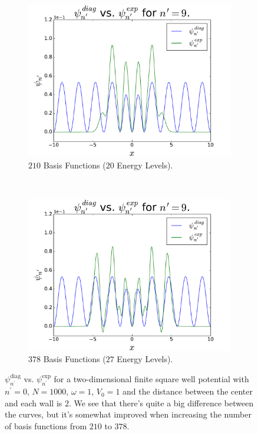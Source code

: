 \documentclass[../main.tex]{subfiles}
\begin{document}
\begin{figure}
    \centering
    \begin{subfigure}{0.5\textwidth}
        \centering
        \includegraphics[scale=0.4]{figures/psiComp/psiCompSquare_nPrime9_BF210}
        \caption{$210$ Basis Functions ($20$ Energy Levels).}
        \label{fig:nPrime9aSquare}
    \end{subfigure}%
    ~ 
    \begin{subfigure}{0.5\textwidth}
        \centering
        \includegraphics[scale=0.4]{figures/psiComp/psiCompSquare_nPrime9_BF378}
        \caption{$378$ Basis Functions ($27$ Energy Levels).}
        \label{fig:nPrime9bSquare}
    \end{subfigure}
    \caption{$\psi_{n^\prime}^\textrm{diag}$ vs. $\psi_{n^\prime}^\textrm{exp}$ for a two-dimensional finite square well potential with $n^\prime = 0$, $N=1000$, $\omega = 1$, $V_0 = 1$ and the distance between the center and each wall is $2$. We see that there's quite a big difference between the curves, but it's somewhat improved when increasing the number of basis functions from $210$ to $378$.}
    \label{fig:nPrime9Square}
\end{figure}
\end{document}
